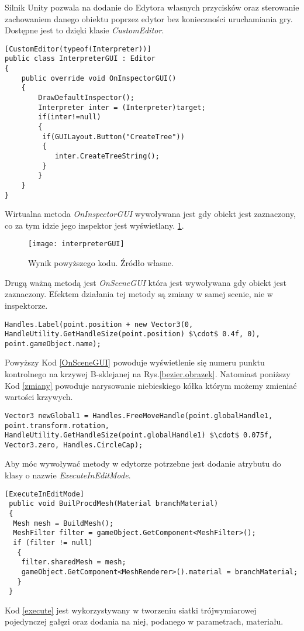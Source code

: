 \documentclass[12pt]{report}
\renewcommand{\figurename}{Rys.}
\newcommand{\codename}{Kod }
\begin{document}
\begin{sloppypar}
Silnik Unity pozwala na dodanie do Edytora własnych przycisków oraz sterowanie zachowaniem danego obiektu poprzez edytor bez konieczności uruchamiania gry. Dostępne jest to dzięki klasie \textit{CustomEditor}. 
\begin{lstlisting}[label=edytor,caption=Kod CustomEdytor dla Interpretera,belowcaptionskip=4pt,captionpos=b]
[CustomEditor(typeof(Interpreter))]
public class InterpreterGUI : Editor 
{
    public override void OnInspectorGUI()
    {
        DrawDefaultInspector();
        Interpreter inter = (Interpreter)target;
        if(inter!=null)
        { 
         if(GUILayout.Button("CreateTree"))
         {
            inter.CreateTreeString();
         }
        }
    }
}
\end{lstlisting}
Wirtualna metoda \textit{OnInspectorGUI} wywoływana jest gdy obiekt jest zaznaczony, co za tym idzie jego inspektor jest wyświetlany. \ref{unity.inspektor}.
\begin{figure}[!htb]
\centering
\texttt{[image: interpreterGUI]} 
\caption{Wynik powyższego kodu. Źródło własne. \label{unity.inspektor}}
\end{figure}
\FloatBarrier
Drugą ważną metodą jest \textit{OnSceneGUI} która jest wywoływana gdy obiekt jest zaznaczony. Efektem działania tej metody są zmiany w samej scenie, nie w inspektorze. 
\begin{lstlisting}[mathescape=true,label=OnSceneGUI,caption=Kod powodujący zmiany na scenie.,belowcaptionskip=4pt,captionpos=b]
Handles.Label(point.position + new Vector3(0, HandleUtility.GetHandleSize(point.position) $\cdot$ 0.4f, 0), point.gameObject.name);
\end{lstlisting}
Powyższy \codename\ref{OnSceneGUI} powoduje wyświetlenie się numeru punktu kontrolnego na krzywej B-sklejanej na \figurename\ref{bezier.obrazek}. Natomiast poniższy \codename\ref{zmiany} powoduje narysowanie niebieskiego kółka którym możemy zmieniać wartości krzywych.
\begin{lstlisting}[mathescape=true,label=zmiany,caption=Tworzenie uchwytów na scenie.,belowcaptionskip=4pt,captionpos=b]
Vector3 newGlobal1 = Handles.FreeMoveHandle(point.globalHandle1, point.transform.rotation, HandleUtility.GetHandleSize(point.globalHandle1) $\cdot$ 0.075f, Vector3.zero, Handles.CircleCap);
\end{lstlisting}
Aby móc wywoływać metody w edytorze potrzebne jest dodanie atrybutu do klasy o nazwie \textit{ExecuteInEditMode}.
\begin{lstlisting}[label=execute,caption=Tworzenie metod wykonywalnych w trybie edytora.,belowcaptionskip=4pt,captionpos=b]
[ExecuteInEditMode]
 public void BuilProcdMesh(Material branchMaterial)
 {
  Mesh mesh = BuildMesh();
  MeshFilter filter = gameObject.GetComponent<MeshFilter>();
  if (filter != null)
   {
    filter.sharedMesh = mesh;
    gameObject.GetComponent<MeshRenderer>().material = branchMaterial;
   }
 }
\end{lstlisting}
\codename \ref{execute} jest wykorzystywany w tworzeniu siatki trójwymiarowej pojedynczej gałęzi oraz dodania na niej, podanego w parametrach, materiału.



\end{sloppypar}
\end{document}
